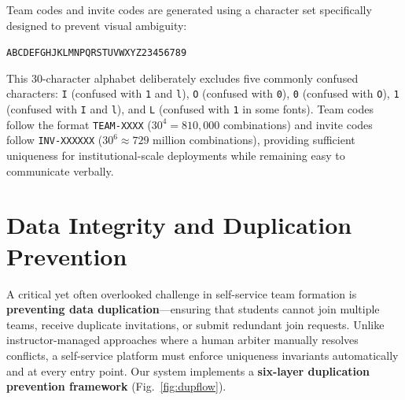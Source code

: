 \documentclass[conference]{IEEEtran}
\begin{document}
Team codes and invite codes are generated using a character set specifically designed to prevent visual ambiguity:

\begin{center}
\texttt{ABCDEFGHJKLMNPQRSTUVWXYZ23456789}
\end{center}

This 30-character alphabet deliberately excludes five commonly confused characters: \texttt{I} (confused with \texttt{1} and \texttt{l}), \texttt{O} (confused with \texttt{0}), \texttt{0} (confused with \texttt{O}), \texttt{1} (confused with \texttt{I} and \texttt{l}), and \texttt{L} (confused with \texttt{1} in some fonts). Team codes follow the format \texttt{TEAM-XXXX} ($30^4 = 810{,}000$ combinations) and invite codes follow \texttt{INV-XXXXXX} ($30^6 \approx 729$ million combinations), providing sufficient uniqueness for institutional-scale deployments while remaining easy to communicate verbally.

\section{Data Integrity and Duplication Prevention}
\label{subsec:duplication}

A critical yet often overlooked challenge in self-service team formation is \textbf{preventing data duplication}---ensuring that students cannot join multiple teams, receive duplicate invitations, or submit redundant join requests. Unlike instructor-managed approaches where a human arbiter manually resolves conflicts, a self-service platform must enforce uniqueness invariants automatically and at every entry point. Our system implements a \textbf{six-layer duplication prevention framework} (Fig.~\ref{fig:dupflow}).
\end{document}
